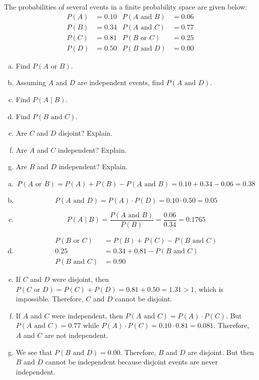 \documentclass[11pt,letterpaper]{article}
\begin{document}

 The probabilities of several events in a finite probability space are given below:
	\[
	\begin{aligned}
	P(A)&= 0.10 & P(A \text{ and } B)&= 0.06 \\
	P(B)&= 0.34 & P(A \text{ and } C)&= 0.77 \\
	P(C)&= 0.81 & P(B \text{ or } C)&= 0.25 \\
	P(D)&= 0.50 & P(B \text{ and } D)&= 0.00
	\end{aligned}
	\] 
\begin{enumerate}[(a)]
\item Find $P(A \text{ or } B)$. 
\item Assuming $A$ and $D$ are independent events, find $P(A \text{ and } D)$.
\item Find $P(A \;|\; B)$.
\item Find $P(B \text{ and } C)$. 
\item Are $C$ and $D$ disjoint? Explain.
\item Are $A$ and $C$ independent? Explain.
\item Are $B$ and $D$ independent? Explain.
\end{enumerate} \pspace

\sol
\begin{enumerate}[(a)]
\item 
	\[
	P(A \text{ or }B)= P(A) + P(B) - P(A \text{ and }B)= 0.10 + 0.34 - 0.06= 0.38
	\]

\item 
	\[
	P(A \text{ and }D)= P(A) \cdot P(D)= 0.10 \cdot 0.50= 0.05
	\]

\item 
	\[
	P(A \;|\; B)= \dfrac{P(A \text{ and }B)}{P(B)}= \dfrac{0.06}{0.34}= 0.1765
	\]

\item 
	\[
	\begin{aligned}
	P(B \text{ or }C)&= P(B) + P(C) - P(B \text{ and }C) \\
	0.25&= 0.34 + 0.81 - P(B \text{ and } C) \\
	P(B \text{ and } C)&= 0.90
	\end{aligned}
	\]

\item If $C$ and $D$ were disjoint, then $P(C \text{ or }D)= P(C) + P(D)= 0.81 + 0.50= 1.31 > 1$, which is impossible. Therefore, $C$ and $D$ cannot be disjoint. 

\item If $A$ and $C$ were independent, then $P(A \text{ and }C)= P(A) \cdot P(C)$. But $P(A \text{ and }C)= 0.77$ while $P(A) \cdot P(C)= 0.10 \cdot 0.81= 0.081$. Therefore, $A$ and $C$ are not independent. 

\item We see that $P(B \text{ and } D)= 0.00$. Therefore, $B$ and $D$ are disjoint. But then $B$ and $D$ cannot be independent because disjoint events are never independent. 
\end{enumerate}
\end{document}
